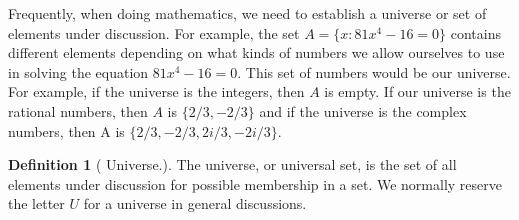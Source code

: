\documentclass[10pt,]{book}
\theoremstyle{plain}
\theoremstyle{definition}
\newtheorem{definition}[theorem]{Definition}
\begin{document}
Frequently, when doing mathematics, we need to establish a universe or set of elements under discussion. For example, the set \(A = \{x : 81x^4 -16 = 0 \}\) contains different elements depending on what kinds of numbers we allow ourselves to use in solving the equation \(81 x^4 -16 = 0\). This set of numbers would be our universe. For example, if the universe is the integers, then \(A\) is empty. If our universe is the
rational numbers, then \( A\) is \(\{2/3, -2/3\}\) and if the universe is the complex numbers, then A is \(\{2/3, -2/3, 2i/3, - 2i/3\}\).
%
\begin{definition}[ Universe.]\label{universe.}
 The universe, or universal set, is the set of all elements under discussion for possible membership
in a set. We normally reserve the letter \( U\) for a universe in general discussions.   
\end{definition}
\typeout{************************************************}
\typeout{************************************************}
\end{document}
